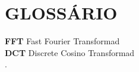 \chapter*{GLOSSÁRIO}
\thispagestyle{plain}
\normalsize{
\textbf{FFT} Fast Fourier Transformad\\
\textbf{DCT} Discrete Cosino Transformad\\

}.